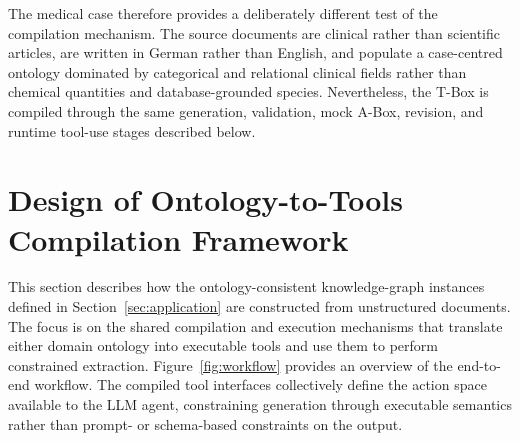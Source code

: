 The medical case therefore provides a deliberately different test of the compilation mechanism. The source documents are clinical rather than scientific articles, are written in German rather than English, and populate a case-centred ontology dominated by categorical and relational clinical fields rather than chemical quantities and database-grounded species. Nevertheless, the T-Box is compiled through the same generation, validation, mock A-Box, revision, and runtime tool-use stages described below.




\section{Design of Ontology-to-Tools Compilation Framework}

This section describes how the ontology-consistent knowledge-graph instances defined in Section~\ref{sec:application} are constructed from unstructured documents. The focus is on the shared compilation and execution mechanisms that translate either domain ontology into executable tools and use them to perform constrained extraction. Figure~\ref{fig:workflow} provides an overview of the end-to-end workflow.
% 
The compiled tool interfaces collectively define the action space available to the LLM agent, constraining generation through executable semantics rather than prompt- or schema-based constraints on the output.

